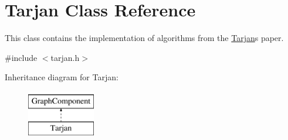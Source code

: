 \hypertarget{class_tarjan}{}\section{Tarjan Class Reference}
\label{class_tarjan}


This class contains the implementation of algorithms from the \hyperlink{class_tarjan}{Tarjan}\textquotesingle{}s paper.  




{\ttfamily \#include $<$tarjan.\+h$>$}

Inheritance diagram for Tarjan\+:\begin{figure}[H]
\begin{center}
\leavevmode
\includegraphics[height=2.000000cm]{class_tarjan}
\end{center}
\end{figure}

